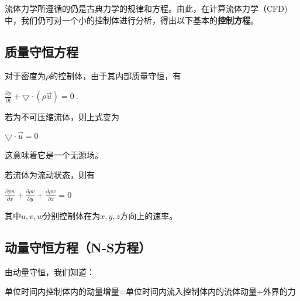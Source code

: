 
\begin{issues}
\issueDraft
\end{issues}


流体力学所遵循的仍是古典力学的规律和方程。由此，在计算流体力学（CFD)中，我们仍可对一个小的控制体进行分析，得出以下基本的\textbf{控制方程}。

\subsection{质量守恒方程}
对于密度为$\rho$的控制体，由于其内部质量守恒，有

$\frac{\partial \rho }{\partial t}+\bigtriangledown \cdot (\rho \overrightarrow{u})=0~.$

若为不可压缩流体，则上式变为

$\bigtriangledown \cdot \overrightarrow{u} =0$

这意味着它是一个无源场。

若流体为流动状态，则有

$\frac{\partial \rho u}{\partial x}+\frac{\partial \rho v}{\partial y}+\frac{\partial \rho w}{\partial z}=0$

其中$u,v,w$分别控制体在为$x,y,z$方向上的速率。


\subsection{动量守恒方程（N-S方程）}
由动量守恒，我们知道：

单位时间内控制体内的动量增量=单位时间内流入控制体内的流体动量+外界的力
